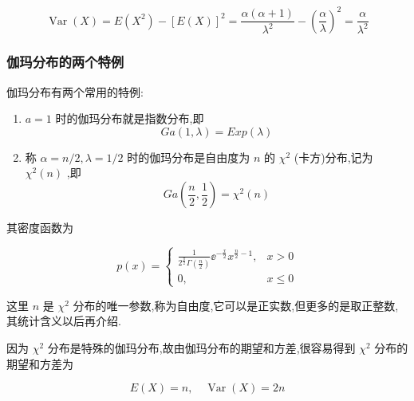 \[
\operatorname{Var}(X)=E\left(X^{2}\right)-[E(X)]^{2}=\frac{\alpha(\alpha+1)}{\lambda^{2}}-\left(\frac{\alpha}{\lambda}\right)^{2}=\frac{\alpha}{\lambda^{2}}
\]

\subsubsection{伽玛分布的两个特例}

伽玛分布有两个常用的特例:

\begin{enumerate}
	\item $ a=1 $ 时的伽玛分布就是指数分布,即
	\begin{equation}
	G a(1, \lambda)=E x p(\lambda) \label{eq:2.5.13}
	\end{equation}
	\item 称 $ \alpha=n / 2, \lambda=1 / 2 $ 时的伽玛分布是自由度为 $ n $ 的 $ \chi^{2} $ (卡方)分布,记为 $ \chi^{2}(n) $ ,即
	\begin{equation}
	G a\left(\frac{n}{2}, \frac{1}{2}\right)=\chi^{2}(n) \label{eq:2.5.14}
	\end{equation}
\end{enumerate}

其密度函数为

\begin{equation}
p(x)=\left\{\begin{array}{ll}
{\frac{1}{2^{\frac{\pi}{2}} \Gamma\left(\frac{n}{2}\right)} \ee ^{-\frac{x}{2}} x^{\frac{n}{2}-1},} & {x>0} \\ 
{0,} & {x \leqslant 0}
\end{array}\right. \label{eq:2.5.15}
\end{equation}

这里 $ n $ 是 $ \chi^{2} $ 分布的唯一参数,称为自由度,它可以是正实数,但更多的是取正整数,其统计含义以后再介绍.

因为 $ \chi^{2} $ 分布是特殊的伽玛分布,故由伽玛分布的期望和方差,很容易得到 $ \chi^{2} $ 分布的期望和方差为

\[
E(X)=n, \quad \operatorname{Var}(X)=2 n
\]


